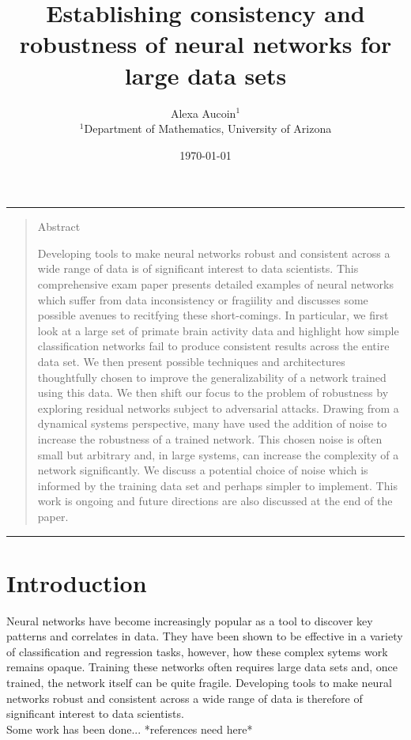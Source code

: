 \documentclass[12pt]{article}
\title{Establishing consistency and robustness of neural networks for large data sets}
\author{Alexa Aucoin$^{1}$ \\ \normalsize{$^{1}$Department of Mathematics, University of Arizona}}
\date{\today}
\newenvironment{sciabstract}{%
\begin{quote} \bf}
{\end{quote}}
\begin{document}


\maketitle

\hrule
\begin{sciabstract}
\begin{center} \large{Abstract}\end{center}
Developing tools to make neural networks robust and consistent across a wide range of data is of significant interest to data scientists. This comprehensive exam paper presents detailed examples of neural networks which suffer from data inconsistency or fragiility and discusses some possible avenues to recitfying these short-comings. In particular, we first look at a large set of primate brain activity data and highlight how simple classification networks fail to produce consistent results across the entire data set. We then present possible techniques and architectures thoughtfully chosen to improve the generalizability of a network trained using this data. We then shift our focus to the problem of robustness by exploring residual networks subject to adversarial attacks. Drawing from a dynamical systems perspective, many have used the addition of noise to increase the robustness of a trained network. This chosen noise is often small but arbitrary and, in large systems, can increase the complexity of a network significantly. We discuss a potential choice of noise which is informed by the training data set and perhaps simpler to implement. This work is ongoing and future directions are also discussed at the end of the paper.
\end{sciabstract}
\hrule

\section{Introduction}Neural networks have become increasingly popular as a tool to discover key patterns and correlates in data. They have been shown to be effective in a variety of classification and regression tasks, however, how these complex sytems work remains opaque. Training these networks often requires large data sets and, once trained, the network itself can be quite fragile. Developing tools to make neural networks robust and consistent across a wide range of data is therefore of significant interest to data scientists. \\
Some work has been done...
*references need here*
\end{document}
